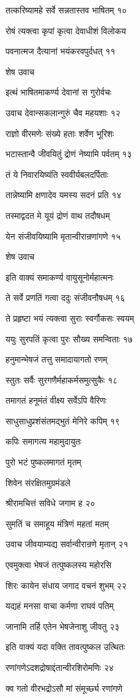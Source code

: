 तत्करिष्यामहे सर्वे सन्नतास्तव भाषितम् १०

रोषं त्यक्त्वा कृपां कृत्वा देवाधीशं विलोकय

पवनात्मज दैत्यानां भयंकरवपुर्दधत् ११

शेष उवाच

इत्थं भाषितमाकर्ण्य देवानां स गुरोर्वचः

उवाच देवान्सकलान्गुरुं चैव महयशाः १२

राज्ञो वीरमणेः संख्ये हताः शर्वेण भूरिशः

भटास्तान्वै जीवयितुं द्रोणं नेष्यामि पर्वतम् १३

तं ये निवारयिष्यंति स्ववीर्यबलदर्पिताः

तान्नेष्यामि क्षणादेव यमस्य सदनं प्रति १४

तस्माद्वदत मे यूयं द्रोणं वाथ तदौषधम्

येन संजीवयिष्यामि मृतान्वीरान्रणांगणे १५

शेष उवाच

इति वाक्यं समाकर्ण्य वायुसूनोर्महात्मनः

ते सर्वे प्रणतिं गत्वा ददुः संजीवनौषधम् १६

ते प्रहृष्टा भयं त्यक्त्वा सुराः स्वर्गौकसः स्वयम्

ययुः सुरपतिं कृत्वा पुरः सौख्य समन्विताः १७

हनुमान्भेषजं तत्तु समादायागतो रणम्

स्तुतः सर्वैः सुरगणैर्महाकर्मसमुत्सुकैः १८

तमागतं हनूमंतं वीक्ष्य सर्वेऽपि वैरिणः

साधुसाधुप्रशंसंतमद्भुतं मेनिरे कपिम् १९

कपिः समागत्य महामुदायुतः

पुरो भटं पुष्कलमागतं मृतम्

शिवेन संरक्षितमुग्रमंडले

श्रीरामचित्तं सविधे जगाम ह २०

सुमतिं च समाहूय मंत्रिणं महतां मतम्

उवाच जीवयाम्यद्य सर्वान्वीरान्रणे मृतान् २१

एवमुक्त्वा भेषजं तत्पुष्कलस्य महोरसि

शिरः कायेन संधाय जगाद वचनं शुभम् २२

यद्यहं मनसा वाचा कर्मणा राघवं पतिम्

जानामि तर्हि एतेन भेषजेनाशु जीवतु २३

इति वाक्यं यदा वक्ति तावत्पुष्कल उत्थितः

रणांगणेऽदशद्रोषाद्दंतान्वीरशिरोमणिः २४

क्व गतो वीरभद्रोऽसौ मां संमूर्च्छ्य रणांगणे


